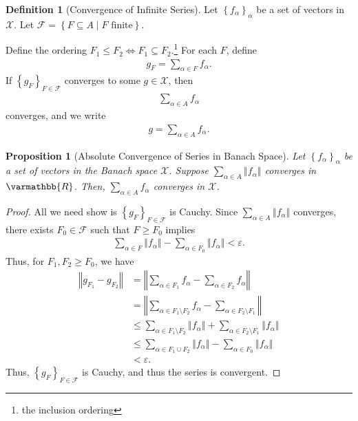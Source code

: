 \documentclass[12pt]{extarticle}
\newcommand{\R}{\mathbb{R}}
\newcommand{\norm}[1]{\left\Vert #1\right\Vert}
\newcommand{\set}[1]{\left\{#1\right\}}
\newcommand{\ve}{\varepsilon}
\theoremstyle{plain}
\newtheorem*{proposition}{Proposition}
\theoremstyle{definition}
\newtheorem*{definition}{Definition}
\theoremstyle{note}
\renewcommand*{\mathbb}[1]{\varmathbb{#1}}
\renewcommand{\newline}{\hfill\break}
\begin{document}
\begin{definition}[Convergence of Infinite Series]
  Let $\set{f_{\alpha}}_{\alpha}$ be a set of vectors in $\mathcal{X}$. Let $\mathcal{F} = \set{F\subseteq A\mid F\text{ finite}}$.\newline

  Define the ordering $F_1\leq F_2 \Leftrightarrow F_1 \subseteq F_2$.\footnote{the inclusion ordering} For each $F$, define
  \begin{align*}
    g_F = \sum_{\alpha \in F}f_{\alpha}.
  \end{align*}
  If $\set{g_F}_{F\in \mathcal{F}}$ converges to some $g\in \mathcal{X}$, then
  \begin{align*}
    \sum_{\alpha \in A}f_{\alpha}
  \end{align*}
  converges, and we write
  \begin{align*}
    g = \sum_{\alpha \in A}f_{\alpha}.
  \end{align*}
\end{definition}
\begin{proposition}[Absolute Convergence of Series in Banach Space]
  Let $\set{f_{\alpha}}_{\alpha}$ be a set of vectors in the Banach space $\mathcal{X}$. Suppose $\displaystyle \sum_{\alpha \in A}\norm{f_{\alpha}}$ converges in $\R$. Then, $\sum_{\alpha \in A}f_{\alpha}$ converges in $\mathcal{X}$.
\end{proposition}
\begin{proof}
  All we need show is $\set{g_{F}}_{F\in \mathcal{F}}$ is Cauchy. Since $\displaystyle \sum_{\alpha \in A}\norm{f_{\alpha}}$ converges, there exists $F_0\in \mathcal{F}$ such that $F\geq F_{0}$ implies
  \begin{align*}
    \sum_{\alpha \in F} \norm{f_{\alpha}} - \sum_{\alpha \in F_{0}}\norm{f_{\alpha}} < \ve.
  \end{align*}
  Thus, for $F_1,F_2 \geq F_0$, we have
  \begin{align*}
    \norm{g_{F_1} - g_{F_2}} &= \norm{\sum_{\alpha \in F_1}f_{\alpha} - \sum_{\alpha \in F_2}f_{\alpha}}\\
                             &= \norm{\sum_{\alpha \in F_1\setminus F_2}f_{\alpha} - \sum_{\alpha \in F_2\setminus F_1}}\\
                             &\leq \sum_{\alpha \in F_{1}\setminus F_2} \norm{f_{\alpha}} + \sum_{\alpha \in F_2\setminus F_1}\norm{f_{\alpha}}\\
                             &\leq \sum_{\alpha \in F_1\cup F_2}\norm{f_{\alpha}} - \sum_{\alpha \in F_0}\norm{f_{\alpha}}\\
                             &< \ve.
  \end{align*}
  Thus, $\set{g_{F}}_{F\in \mathcal{F}}$ is Cauchy, and thus the series is convergent.
\end{proof}
\end{document}
